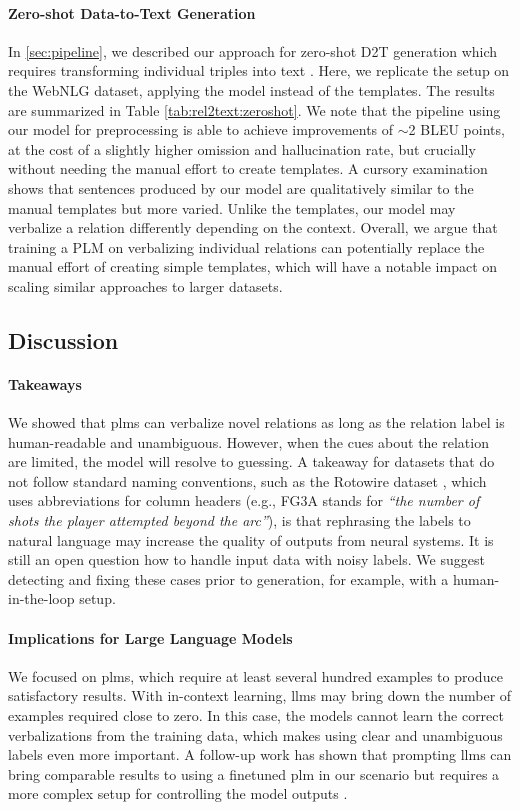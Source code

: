 \paragraph{Zero-shot Data-to-Text Generation} In \autoref{sec:pipeline}, we described our approach for zero-shot D2T generation which requires transforming individual triples into text \cite{kasner2022neural}. Here, we replicate the setup on the WebNLG dataset, applying the \BARTr{} model instead of the templates. The results are summarized in Table \ref{tab:rel2text:zeroshot}.  We note that the pipeline using our model for preprocessing is able to achieve improvements of $\sim$2 BLEU points, at the cost of a slightly higher omission and hallucination rate, but crucially without needing the manual effort to create templates. A cursory examination shows that sentences produced by our model are qualitatively similar to the manual templates but more varied. Unlike the templates, our model may verbalize a relation differently depending on the context.
Overall, we argue that training a PLM on verbalizing individual relations can potentially replace the manual effort of creating simple templates, which will have a notable impact on scaling similar approaches to larger datasets.


\subsection{Discussion}

\paragraph{Takeaways} We showed that \acp{plm} can verbalize novel relations as long as the relation label is human-readable and unambiguous. However, when the cues about the relation are limited, the model will resolve to guessing. A takeaway for datasets that do not follow standard naming conventions, such as the Rotowire dataset \cite{wiseman2017challenges}, which uses abbreviations for column headers (e.g., FG3A stands for \textit{``the number of shots the player attempted beyond the arc''}), is that rephrasing the labels to natural language may increase the quality of outputs from neural systems. It is still an open question how to handle input data with noisy labels. We suggest detecting and fixing these cases prior to generation, for example, with a human-in-the-loop setup.


\paragraph{Implications for Large Language Models} We focused on \acp{plm}, which require at least several hundred examples to produce satisfactory results. With in-context learning, \acp{llm} may bring down the number of examples required close to zero. In this case, the models cannot learn the correct verbalizations from the training data, which makes using clear and unambiguous labels even more important. A follow-up work has shown that prompting \acp{llm} can bring comparable results to using a finetuned \ac{plm} in our scenario but requires a more complex setup for controlling the model outputs \cite{vejvarASPIROAnyshotStructured2023}.

